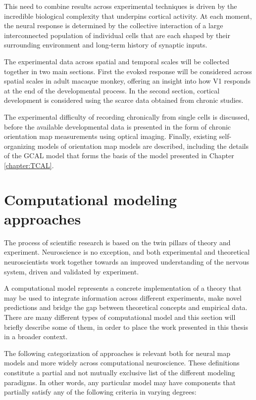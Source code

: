\documentclass[phd,ianc,twoside]{infthesis}
\begin{document}
This need to combine results across experimental techniques is driven by
the incredible biological complexity that underpins cortical
activity. At each moment, the neural response is determined by the
collective interaction of a large interconnected population of
individual cells that are each shaped by their surrounding environment
and long-term history of synaptic inputs.

The experimental data across spatial and temporal scales will be
collected together in two main sections. First the evoked response will
be considered across spatial scales in adult macaque monkey, offering an
insight into how V1 responds at the end of the developmental process. In
the second section, cortical development is considered using the scarce
data obtained from chronic studies.

The experimental difficulty of recording chronically from single cells
is discussed, before the available developmental data is presented in the
form of chronic orientation map measurements using optical
imaging. Finally, existing self-organizing models of orientation map
models are described, including the details of the GCAL model that forms
the basis of the model presented in Chapter \ref{chapter:TCAL}.

\section{Computational modeling approaches}

The process of scientific research is based on the twin pillars of
theory and experiment. Neuroscience is no exception, and both
experimental and theoretical neuroscientists work together towards an
improved understanding of the nervous system, driven and validated by
experiment.

A computational model represents a concrete implementation of a theory
that may be used to integrate information across different
experiments, make novel predictions and bridge the gap between
theoretical concepts and empirical data. There are many different types
of computational model and this section will briefly describe some of
them, in order to place the work presented in this thesis in a broader
context.

The following categorization of approaches is relevant both for
neural map models \citep{bednar_fnc16} and more widely
across computational neuroscience. These definitions constitute a
partial and not mutually exclusive list of the different modeling
paradigms. In other words, any particular model may have components that
partially satisfy any of the following criteria in varying degrees:
\end{document}
